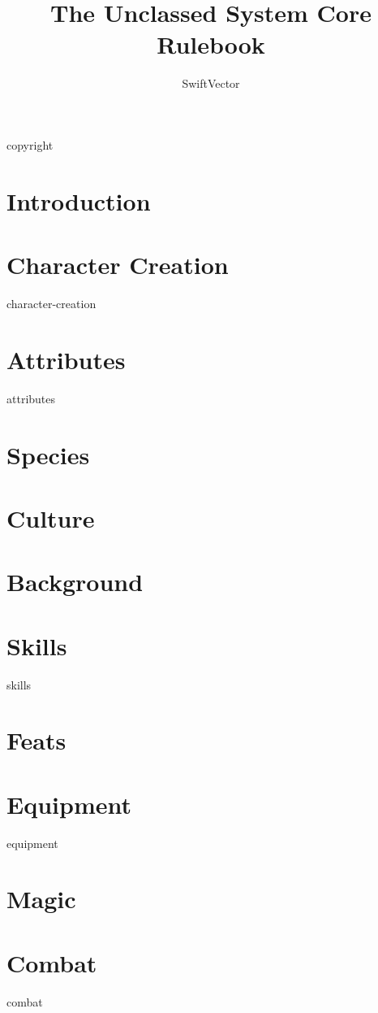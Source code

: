\documentclass{book}
\title{The Unclassed System Core Rulebook}
\author{SwiftVector}
\begin{document}
\maketitle

\frontmatter

{copyright}

\tableofcontents

\mainmatter
\chapter{Introduction}


\chapter{Character Creation}
{character-creation}

\chapter{Attributes}\label{attributes}
{attributes}

\chapter{Species}\label{species}


\chapter{Culture}\label{culture}


\chapter{Background}\label{background}


\chapter{Skills}\label{skills}
{skills}

\chapter{Feats}\label{feats}


\chapter{Equipment}\label{equipment}
{equipment}

\chapter{Magic}\label{magic}


\chapter{Combat}\label{combat}
{combat}

\backmatter

\printindex

\glsaddallunused
\printglossary[type=\acronymtype]
\printglossary
\end{document}
